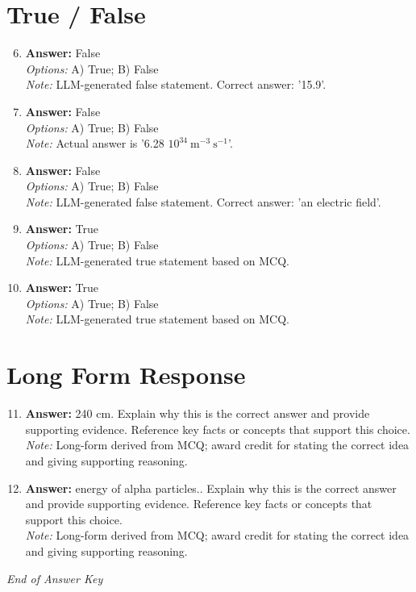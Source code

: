 \documentclass[12pt]{article}
\begin{document}
\section*{True / False}
\begin{enumerate}[label=\arabic*.]
\setcounter{enumi}{5}
\item \textbf{Answer:} False
\\ \textit{Options:} A) True; B) False
\\ \textit{Note:} LLM-generated false statement. Correct answer: '15.9'.
\item \textbf{Answer:} False
\\ \textit{Options:} A) True; B) False
\\ \textit{Note:} Actual answer is '6.28 $10^{34} \mathrm{~m}^{-3} \mathrm{~s}^{-1}$'.
\item \textbf{Answer:} False
\\ \textit{Options:} A) True; B) False
\\ \textit{Note:} LLM-generated false statement. Correct answer: 'an electric field'.
\item \textbf{Answer:} True
\\ \textit{Options:} A) True; B) False
\\ \textit{Note:} LLM-generated true statement based on MCQ.
\item \textbf{Answer:} True
\\ \textit{Options:} A) True; B) False
\\ \textit{Note:} LLM-generated true statement based on MCQ.
\end{enumerate}

\section*{Long Form Response}
\begin{enumerate}[label=\arabic*.]
\setcounter{enumi}{10}
\item \textbf{Answer:} 240 cm. Explain why this is the correct answer and provide supporting evidence. Reference key facts or concepts that support this choice.
\\ \textit{Note:} Long-form derived from MCQ; award credit for stating the correct idea and giving supporting reasoning.
\item \textbf{Answer:} energy of alpha particles.. Explain why this is the correct answer and provide supporting evidence. Reference key facts or concepts that support this choice.
\\ \textit{Note:} Long-form derived from MCQ; award credit for stating the correct idea and giving supporting reasoning.
\end{enumerate}

\vfill
\noindent\textit{End of Answer Key}
\end{document}
